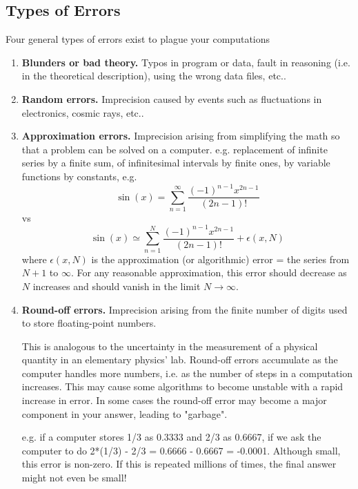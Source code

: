 \documentclass[../../../main.tex]{subfiles}
\begin{document}
\subsection{Types of Errors}

Four general types of errors exist to plague your computations
\begin{enumerate}
    \item \textbf{Blunders or bad theory.} Typos in program or data, fault in reasoning (i.e. in the theoretical description), using the wrong data files, etc..
    \item \textbf{Random errors.} Imprecision caused by events such as fluctuations in electronics, cosmic rays, etc..
    \item \textbf{Approximation errors.} Imprecision arising from simplifying the math so that a problem can be solved on a computer. e.g. replacement of infinite series by a finite sum, of infinitesimal intervals by finite ones, by variable functions by constants, e.g.
    \begin{equation*}
        \sin(x) = \sum_{n=1}^{\infty} \frac{ (-1)^{n-1} x^{2n-1} } { (2n-1)! }
    \end{equation*}
    vs 
    \begin{equation*}
       \sin(x) \simeq \sum_{n=1}^{N} \frac{ (-1)^{n-1} x^{2n-1} } { (2n-1)! } + \epsilon(x,N)
    \end{equation*}
    where $\epsilon(x,N)$  is the approximation (or algorithmic) error = the series from $N+1$ to $\infty$. 
    For any reasonable approximation, this error should decrease as $N$ increases and should vanish in the limit $N\rightarrow \infty$. 
    \item \textbf{Round-off errors.} Imprecision arising from the finite number of digits used to store floating-point numbers. 
    
    This is analogous to the uncertainty in the measurement of a physical quantity in an elementary physics' lab. Round-off errors accumulate as the computer handles more numbers, i.e. as the number of steps in a computation increases. This may cause some algorithms to become unstable with a rapid increase in error. In some cases the round-off error may become a major component in your answer, leading to "garbage". 
    
    e.g. if a computer stores 1/3 as 0.3333 and 2/3 as 0.6667, if we ask the computer to do 2*(1/3) - 2/3 = 0.6666 - 0.6667 = -0.0001. Although small, this error is non-zero. If this is repeated millions of times, the final answer might not even be small! 
\end{enumerate}
\end{document}
